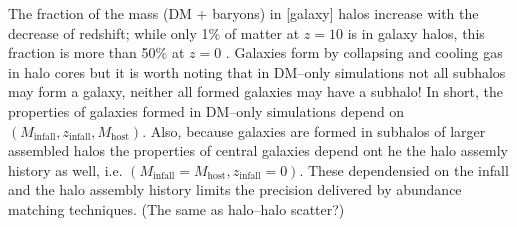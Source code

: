 \documentclass[paper=a4, fontsize=11pt]{scrartcl} %
\numberwithin{equation}{section} %
\numberwithin{figure}{section} %
\numberwithin{table}{section} %
\begin{document}
The fraction of the mass (DM + baryons) in [galaxy] halos increase with the decrease of redshift; while only 1$\%$ of matter at $z=10$ is in galaxy halos, this fraction is more than 50$\%$ at $z=0$ \citet[][]{Angulo&White2010}. Galaxies form by collapsing and cooling gas in halo cores but it is worth noting that in DM--only simulations not all subhalos may form a galaxy, neither all formed galaxies may have a subhalo! In short, the properties of galaxies formed in DM--only simulations depend on $(M_\mathrm{infall}, z_\mathrm{infall}, M_\mathrm{host})$. Also, because galaxies are formed in subhalos of larger assembled halos the properties of central galaxies depend ont he the halo assemly history as well, i.e. $(M_\mathrm{infall}=M_\mathrm{host}, z_\mathrm{infall}=0)$. These dependensied on the infall and the halo assembly history limits the precision delivered by abundance matching techniques. (The same as halo--halo scatter?)
\end{document}
